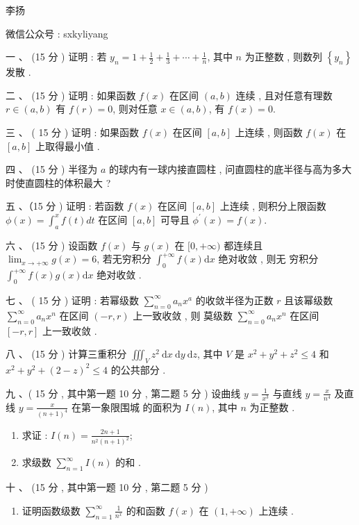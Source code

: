 \documentclass[10pt]{article}
\begin{document}
{ 李扬 

 微信公众号 : sxkyliyang

 一 、 (15  分 )  证明 :  若  $y_{n}=1+\frac{1}{2}+\frac{1}{3}+\cdots+\frac{1}{n}$,  其中  $n$  为正整数 ,  则数列  $\left\{y_{n}\right\}$  发散 .

 二 、 (15  分 )  证明 :  如果函数  $f(x)$  在区间  $(a, b)$  连续 ,  且对任意有理数  $r \in(a, b)$  有  $f(r)=0$,  则对任意  $x \in(a, b)$,  有  $f(x)=0$.

 三 、 ( 15  分 )  证明 :  如果函数  $f(x)$  在区间  $[a, b]$  上连续 ,  则函数  $f(x)$  在  $[a, b]$  上取得最小值 .

 四 、 (15  分 )  半径为  $a$  的球内有一球内接直圆柱 ,  问直圆柱的底半径与高为多大时使直圆柱的体积最大 ?

 五 、（15  分 )  证明 :  若函数  $f(x)$  在区间  $[a, b]$  上连续 ,  则积分上限函数  $\phi(x)=\int_{a}^{x} f(t) d t$  在区间  $[a, b]$  可导且  $\phi^{\prime}(x)=f(x) .$

 六 、 (15  分 )  设函数  $f(x)$  与  $g(x)$  在  $[0,+\infty)$  都连续且  $\lim _{x \rightarrow+\infty} g(x)=6$,  若无穷积分  $\int_{0}^{+\infty} f(x) \mathrm{d} x$  绝对收敛 ,  则无   穷积分  $\int_{0}^{+\infty} f(x) g(x) \mathrm{d} x$  绝对收敛 .

 七 、 ( 15  分 )  证明 :  若幂级数  $\sum_{n=0}^{\infty} a_{n} x^{a}$  的收敛半径为正数  $r$  且该幂级数  $\sum_{n=0}^{\infty} a_{n} x^{n}$  在区间  $(-r, r)$  上一致收敛 ,  则   莫级数  $\sum_{n=0}^{\infty} a_{n} x^{n}$  在区间  $[-r, r]$  上一致收敛 .

 八 、 (15  分 )  计算三重积分  $\iiint_{V} z^{2} \mathrm{~d} x \mathrm{~d} y \mathrm{~d} z$,  其中  $V$  是  $x^{2}+y^{2}+z^{2} \leq 4$  和  $x^{2}+y^{2}+(2-z)^{2} \leq 4$  的公共部分 .

 九 、( 15  分 ,  其中第一题  10  分 ,  第二题  5  分 )  设曲线  $y=\frac{1}{x^{3}}$  与直线  $y=\frac{x}{n^{4}}$  及直线  $y=\frac{x}{(n+1)^{4}}$  在第一象限围城   的面积为  $I(n)$,  其中  $n$  为正整数 .

\begin{enumerate}
  \item  求证 : $I(n)=\frac{2 n+1}{n^{2}(n+1)^{2}}$;

  \item  求级数  $\sum_{n=1}^{\infty} I(n)$  的和 .

\end{enumerate}
 十 、 (15  分 ,  其中第一题  10  分 ,  第二题  5  分 )

\begin{enumerate}
  \item  证明函数级数  $\sum_{n=1}^{\infty} \frac{1}{n^{x}}$  的和函数  $f(x)$  在  $(1,+\infty)$  上连续 .


\end{enumerate}}
\end{document}
